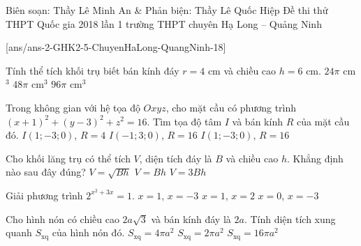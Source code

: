 \begin{name}
{Biên soạn: Thầy Lê Minh An \& Phản biện: Thầy Lê Quốc Hiệp}
{Đề thi thử THPT Quốc gia 2018 lần 1 trường THPT chuyên Hạ Long – Quảng Ninh}
\end{name}
\setcounter{ex}{0}\setcounter{bt}{0}
[ans/ans-2-GHK2-5-ChuyenHaLong-QuangNinh-18]
\begin{ex}%
Tính thể tích khối trụ biết bán kính đáy $r=4$ cm và chiều cao $h=6$ cm.
{$24\pi$ cm$^3$}
{$48\pi$ cm$^3$}
{\True $96\pi$ cm$^3$}
\end{ex}

\begin{ex}%
Trong không gian với hệ tọa độ $Oxyz$, cho mặt cầu có phương trình $(x+1)^2+(y-3)^2+z^2=16$. Tìm tọa độ tâm $I$ và bán kính $R$ của mặt cầu đó.
{$I(1;-3;0)$, $R=4$}
{$I(-1;3;0)$, $R=16$}
{$I(1;-3;0)$, $R=16$}
\end{ex}

\begin{ex}%
Cho khối lăng trụ có thể tích $V$, diện tích đáy là $B$ và chiều cao $h$. Khẳng định nào sau đây đúng?
{$V=\sqrt{Bh}$}
{\True $V=Bh$}
{$V=3Bh$}
\end{ex}

\begin{ex}%
Giải phương trình $2^{x^2+3x}=1$.
{$x=1$, $x=-3$}
{$x=1$, $x=2$}
{\True $x=0$, $x=-3$}
\end{ex}

\begin{ex}%
Cho hình nón có chiều cao $2a\sqrt{3}$ và bán kính đáy là $2a$. Tính diện tích xung quanh $S_{\mathrm{xq}}$ của hình nón đó.
{$S_{\mathrm{xq}}=4\pi a^2$}
{$S_{\mathrm{xq}}=2\pi a^2$}
{$S_{\mathrm{xq}}=16\pi a^2$}
\end{ex}


